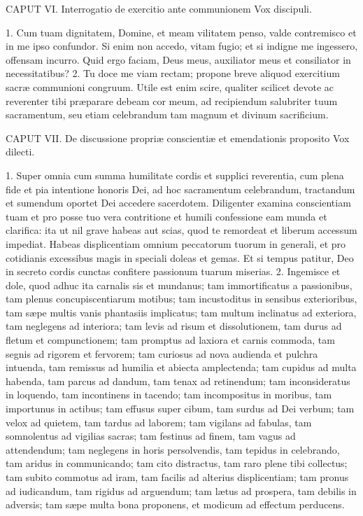\documentclass[twoside]{article}
\begin{document}
CAPUT VI.
Interrogatio de exercitio ante communionem
Vox discipuli.

1. Cum tuam dignitatem, Domine, et meam vilitatem penso, valde contremisco et in me ipso confundor. Si enim non accedo, vitam fugio; et si indigne me ingessero, offensam incurro. Quid ergo faciam, Deus meus, auxiliator meus et consiliator in necessitatibus?
2. Tu doce me viam rectam; propone breve aliquod exercitium sacræ communioni congruum. Utile est enim scire, qualiter scilicet devote ac reverenter tibi præparare debeam cor meum, ad recipiendum salubriter tuum sacramentum, seu etiam celebrandum tam magnum et divinum sacrificium.


CAPUT VII.
De discussione propriæ conscientiæ et emendationis proposito
Vox dilecti.

1. Super omnia cum summa humilitate cordis et supplici reverentia, cum plena fide et pia intentione honoris Dei, ad hoc sacramentum celebrandum, tractandum et sumendum oportet Dei accedere sacerdotem. Diligenter examina conscientiam tuam et pro posse tuo vera contritione et humili confessione eam munda et clarifica: ita ut nil grave habeas aut scias, quod te remordeat et liberum accessum impediat. Habeas displicentiam omnium peccatorum tuorum in generali, et pro cotidianis excessibus magis in speciali doleas et gemas. Et si tempus patitur, Deo in secreto cordis cunctas confitere passionum tuarum miserias.
2. Ingemisce et dole, quod adhuc ita carnalis sis et mundanus; tam immortificatus a passionibus, tam plenus concupiscentiarum motibus; tam incustoditus in sensibus exterioribus, tam sæpe multis vanis phantasiis implicatus; tam multum inclinatus ad exteriora, tam neglegens ad interiora; tam levis ad risum et dissolutionem, tam durus ad fletum et compunctionem; tam promptus ad laxiora et carnis commoda, tam segnis ad rigorem et fervorem; tam curiosus ad nova audienda et pulchra intuenda, tam remissus ad humilia et abiecta amplectenda; tam cupidus ad multa habenda, tam parcus ad dandum, tam tenax ad retinendum; tam inconsideratus in loquendo, tam incontinens in tacendo; tam incompositus in moribus, tam importunus in actibus; tam effusus super cibum, tam surdus ad Dei verbum; tam velox ad quietem, tam tardus ad laborem; tam vigilans ad fabulas, tam somnolentus ad vigilias sacras; tam festinus ad finem, tam vagus ad attendendum; tam neglegens in horis persolvendis, tam tepidus in celebrando, tam aridus in communicando; tam cito distractus, tam raro plene tibi collectus; tam subito commotus ad iram, tam facilis ad alterius displicentiam; tam pronus ad iudicandum, tam rigidus ad arguendum; tam lætus ad prospera, tam debilis in adversis; tam sæpe multa bona proponens, et modicum ad effectum perducens.
\end{document}
